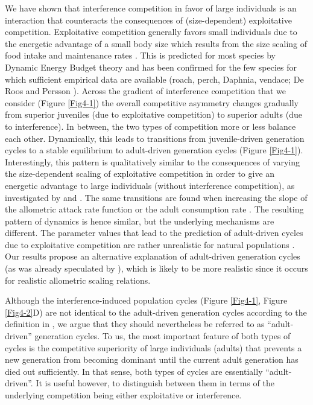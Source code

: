 We have shown that interference competition in favor of large individuals is an
interaction that counteracts the consequences of (size-dependent) exploitative
competition. Exploitative competition generally favors small individuals due to
the energetic advantage of a small body size which results from the size scaling
of food intake and maintenance rates
\autocites{peters1986a,persson1998a,de-roos2013a}. This is predicted for most
species by Dynamic Energy Budget theory \autocites{kooijman2000a} and has been
confirmed for the few species for which sufficient empirical data are available
(roach, perch, Daphnia, vendace; De Roos and Persson \citeyear{de-roos2013a}).
Across the gradient of interference competition that we consider (Figure
\ref{Fig4-1}) the overall competitive asymmetry changes gradually from superior
juveniles (due to exploitative competition) to superior adults (due to
interference). In between, the two types of competition more or less balance
each other. Dynamically, this leads to transitions from juvenile-driven
generation cycles to a stable equilibrium to adult-driven generation cycles
(Figure \ref{Fig4-1}).
Interestingly, this pattern is qualitatively similar to the consequences of
varying the size-dependent scaling of exploitative competition in order to give
an energetic advantage to large individuals (without interference competition),
as investigated by \textcite{persson1998a} and \textcite{de-roos2003a}.
The same transitions are found when increasing the slope of the allometric
attack rate function \autocites{persson1998a} or the adult consumption rate
\autocites{de-roos2003a}. The resulting pattern of dynamics is hence similar, but
the underlying mechanisms are different. The parameter values that lead to the
prediction of adult-driven cycles due to exploitative competition are rather
unrealistic for natural populations \autocites{persson1998a,de-roos2003a}. Our
results propose an alternative explanation of adult-driven generation cycles (as
was already speculated by \textcite{de-roos2003a}), which is likely to be more
realistic since it occurs for realistic allometric scaling relations.

Although the interference-induced population cycles (Figure \ref{Fig4-1}, Figure
\ref{Fig4-2}D) are not identical to the adult-driven generation cycles according
to the definition in \textcite{de-roos2003a}, we argue that they should
nevertheless be referred to as “adult-driven” generation cycles. To us, the most
important feature of both types of cycles is the competitive superiority of
large individuals (adults) that prevents a new generation from becoming dominant
until the current adult generation has died out sufficiently. In that sense,
both types of cycles are essentially “adult-driven”. It is useful however, to
distinguish between them in terms of the underlying competition being either
exploitative or interference.

